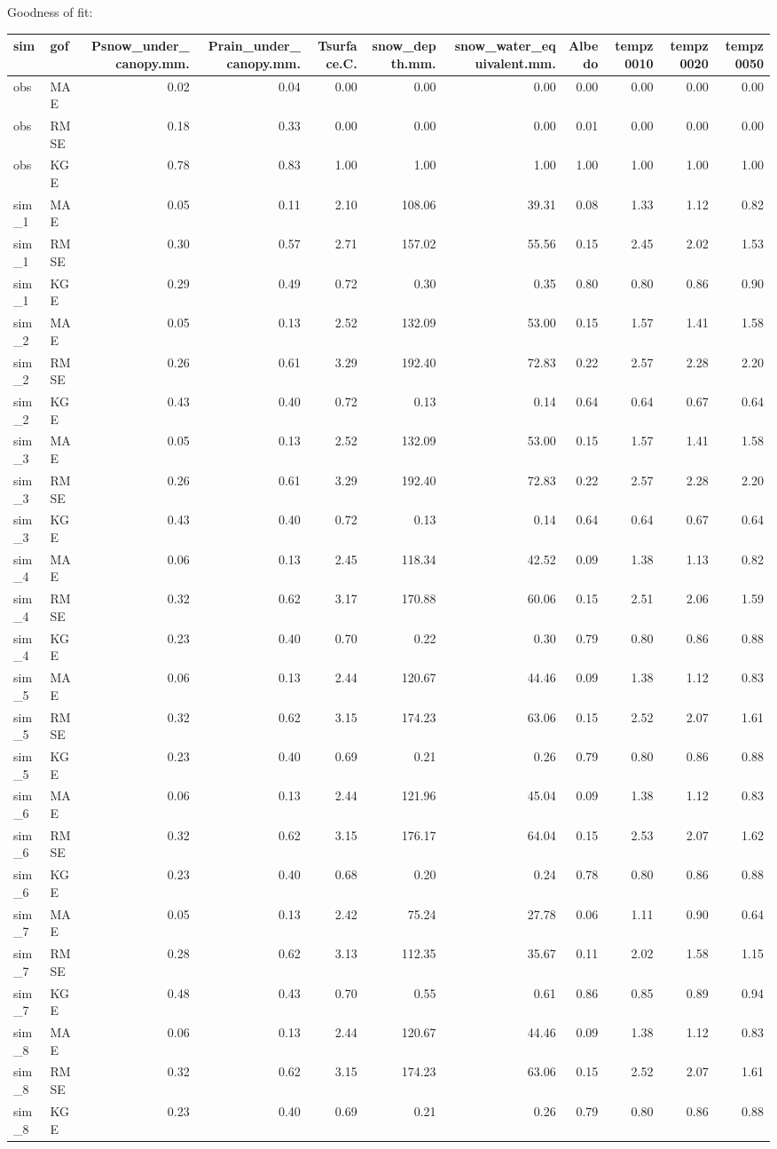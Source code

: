 \documentclass[
]{article}
\begin{document}
Goodness of fit:

\begin{longtable}[]{@{}llrrrrrrrrr@{}}
\toprule
sim & gof & Psnow\_under\_canopy.mm. & Prain\_under\_canopy.mm. &
Tsurface.C. & snow\_depth.mm. & snow\_water\_equivalent.mm. & Albedo &
tempz0010 & tempz0020 & tempz0050\tabularnewline
\midrule
\endhead
obs & MAE & 0.02 & 0.04 & 0.00 & 0.00 & 0.00 & 0.00 & 0.00 & 0.00 &
0.00\tabularnewline
obs & RMSE & 0.18 & 0.33 & 0.00 & 0.00 & 0.00 & 0.01 & 0.00 & 0.00 &
0.00\tabularnewline
obs & KGE & 0.78 & 0.83 & 1.00 & 1.00 & 1.00 & 1.00 & 1.00 & 1.00 &
1.00\tabularnewline
sim\_1 & MAE & 0.05 & 0.11 & 2.10 & 108.06 & 39.31 & 0.08 & 1.33 & 1.12
& 0.82\tabularnewline
sim\_1 & RMSE & 0.30 & 0.57 & 2.71 & 157.02 & 55.56 & 0.15 & 2.45 & 2.02
& 1.53\tabularnewline
sim\_1 & KGE & 0.29 & 0.49 & 0.72 & 0.30 & 0.35 & 0.80 & 0.80 & 0.86 &
0.90\tabularnewline
sim\_2 & MAE & 0.05 & 0.13 & 2.52 & 132.09 & 53.00 & 0.15 & 1.57 & 1.41
& 1.58\tabularnewline
sim\_2 & RMSE & 0.26 & 0.61 & 3.29 & 192.40 & 72.83 & 0.22 & 2.57 & 2.28
& 2.20\tabularnewline
sim\_2 & KGE & 0.43 & 0.40 & 0.72 & 0.13 & 0.14 & 0.64 & 0.64 & 0.67 &
0.64\tabularnewline
sim\_3 & MAE & 0.05 & 0.13 & 2.52 & 132.09 & 53.00 & 0.15 & 1.57 & 1.41
& 1.58\tabularnewline
sim\_3 & RMSE & 0.26 & 0.61 & 3.29 & 192.40 & 72.83 & 0.22 & 2.57 & 2.28
& 2.20\tabularnewline
sim\_3 & KGE & 0.43 & 0.40 & 0.72 & 0.13 & 0.14 & 0.64 & 0.64 & 0.67 &
0.64\tabularnewline
sim\_4 & MAE & 0.06 & 0.13 & 2.45 & 118.34 & 42.52 & 0.09 & 1.38 & 1.13
& 0.82\tabularnewline
sim\_4 & RMSE & 0.32 & 0.62 & 3.17 & 170.88 & 60.06 & 0.15 & 2.51 & 2.06
& 1.59\tabularnewline
sim\_4 & KGE & 0.23 & 0.40 & 0.70 & 0.22 & 0.30 & 0.79 & 0.80 & 0.86 &
0.88\tabularnewline
sim\_5 & MAE & 0.06 & 0.13 & 2.44 & 120.67 & 44.46 & 0.09 & 1.38 & 1.12
& 0.83\tabularnewline
sim\_5 & RMSE & 0.32 & 0.62 & 3.15 & 174.23 & 63.06 & 0.15 & 2.52 & 2.07
& 1.61\tabularnewline
sim\_5 & KGE & 0.23 & 0.40 & 0.69 & 0.21 & 0.26 & 0.79 & 0.80 & 0.86 &
0.88\tabularnewline
sim\_6 & MAE & 0.06 & 0.13 & 2.44 & 121.96 & 45.04 & 0.09 & 1.38 & 1.12
& 0.83\tabularnewline
sim\_6 & RMSE & 0.32 & 0.62 & 3.15 & 176.17 & 64.04 & 0.15 & 2.53 & 2.07
& 1.62\tabularnewline
sim\_6 & KGE & 0.23 & 0.40 & 0.68 & 0.20 & 0.24 & 0.78 & 0.80 & 0.86 &
0.88\tabularnewline
sim\_7 & MAE & 0.05 & 0.13 & 2.42 & 75.24 & 27.78 & 0.06 & 1.11 & 0.90 &
0.64\tabularnewline
sim\_7 & RMSE & 0.28 & 0.62 & 3.13 & 112.35 & 35.67 & 0.11 & 2.02 & 1.58
& 1.15\tabularnewline
sim\_7 & KGE & 0.48 & 0.43 & 0.70 & 0.55 & 0.61 & 0.86 & 0.85 & 0.89 &
0.94\tabularnewline
sim\_8 & MAE & 0.06 & 0.13 & 2.44 & 120.67 & 44.46 & 0.09 & 1.38 & 1.12
& 0.83\tabularnewline
sim\_8 & RMSE & 0.32 & 0.62 & 3.15 & 174.23 & 63.06 & 0.15 & 2.52 & 2.07
& 1.61\tabularnewline
sim\_8 & KGE & 0.23 & 0.40 & 0.69 & 0.21 & 0.26 & 0.79 & 0.80 & 0.86 &
0.88\tabularnewline
\bottomrule
\end{longtable}
\end{document}
